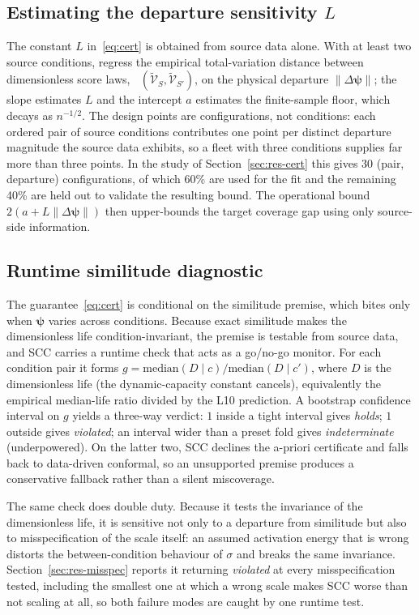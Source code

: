\documentclass[review,times]{elsarticle}
\theoremstyle{definition}
\theoremstyle{remark}
\DeclareMathOperator{\dtv}{d_{\mathrm{TV}}}
\begin{document}
\subsection{Estimating the departure sensitivity $L$}\label{sec:estL}
The constant $L$ in~\eqref{eq:cert} is obtained from source data alone. With at least two source
conditions, regress the empirical total-variation distance between dimensionless score laws,
$\dtv(\tilde{\mathcal V}_S,\tilde{\mathcal V}_{S'})$, on the physical departure
$\lVert\Delta\boldsymbol\psi\rVert$; the slope estimates $L$ and the intercept $a$ estimates the
finite-sample floor, which decays as $n^{-1/2}$. The design points are configurations, not conditions:
each ordered pair of source conditions contributes one point per distinct departure magnitude the
source data exhibits, so a fleet with three conditions supplies far more than three points. In the
study of Section~\ref{sec:res-cert} this gives 30 (pair, departure) configurations, of which 60\% are
used for the fit and the remaining 40\% are held out to validate the resulting bound. The operational bound
$2(a+L\lVert\Delta\boldsymbol\psi\rVert)$ then upper-bounds the target coverage gap using only
source-side information.

\subsection{Runtime similitude diagnostic}\label{sec:diagnostic}
The guarantee~\eqref{eq:cert} is conditional on the similitude premise, which bites only when
$\boldsymbol\psi$ varies across conditions. Because exact similitude makes the dimensionless life
condition-invariant, the premise is testable from source data, and SCC carries a runtime check that
acts as a go/no-go monitor. For each condition pair it forms
$g=\mathrm{median}(D\mid c)/\mathrm{median}(D\mid c')$, where $D$ is the dimensionless life (the
dynamic-capacity constant cancels), equivalently the empirical median-life ratio divided by the L10
prediction. A bootstrap confidence interval on $g$ yields a three-way verdict: $1$ inside a tight
interval gives \emph{holds}; $1$ outside gives \emph{violated}; an interval wider than a preset fold
gives \emph{indeterminate} (underpowered). On the latter two, SCC declines the a-priori certificate
and falls back to data-driven conformal, so an unsupported premise produces a conservative fallback
rather than a silent miscoverage.

The same check does double duty. Because it tests the invariance of the dimensionless life, it is
sensitive not only to a departure from similitude but also to misspecification of the scale itself:
an assumed activation energy that is wrong distorts the between-condition behaviour of $\sigma$ and
breaks the same invariance. Section~\ref{sec:res-misspec} reports it returning \emph{violated} at
every misspecification tested, including the smallest one at which a wrong scale makes SCC worse
than not scaling at all, so both failure modes are caught by one runtime test.
\end{document}
